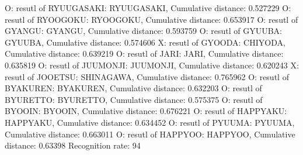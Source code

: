 O: resutl of RYUUGASAKI: RYUUGASAKI, Cumulative distance: 0.527229
O: resutl of RYOOGOKU: RYOOGOKU, Cumulative distance: 0.653917
O: resutl of GYANGU: GYANGU, Cumulative distance: 0.593759
O: resutl of GYUUBA: GYUUBA, Cumulative distance: 0.574606
X: resutl of GYOODA: CHIYODA, Cumulative distance: 0.639219
O: resutl of JARI: JARI, Cumulative distance: 0.635819
O: resutl of JUUMONJI: JUUMONJI, Cumulative distance: 0.620243
X: resutl of JOOETSU: SHINAGAWA, Cumulative distance: 0.765962
O: resutl of BYAKUREN: BYAKUREN, Cumulative distance: 0.632203
O: resutl of BYURETTO: BYURETTO, Cumulative distance: 0.575375
O: resutl of BYOOIN: BYOOIN, Cumulative distance: 0.676221
O: resutl of HAPPYAKU: HAPPYAKU, Cumulative distance: 0.634452
O: resutl of PYUUMA: PYUUMA, Cumulative distance: 0.663011
O: resutl of HAPPYOO: HAPPYOO, Cumulative distance: 0.63398
Recognition rate: 94%
